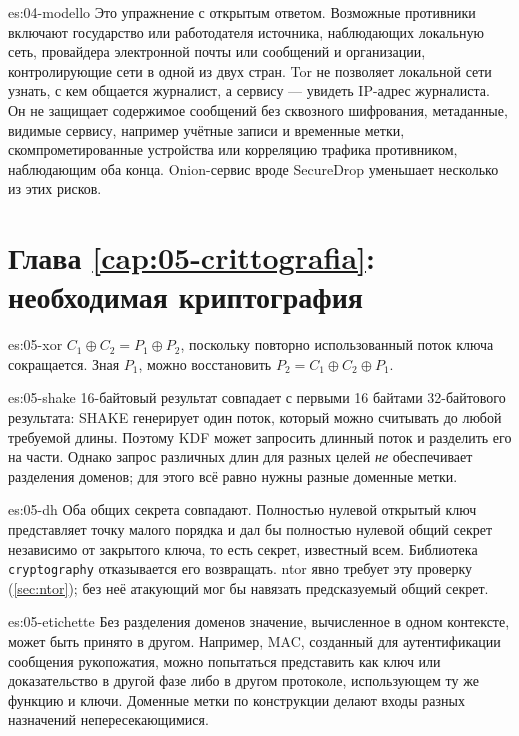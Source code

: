 \begin{soluzione}{es:04-modello}
Это упражнение с открытым ответом. Возможные противники включают государство или работодателя источника, наблюдающих локальную сеть, провайдера электронной почты или сообщений и организации, контролирующие сети в одной из двух стран. Tor не позволяет локальной сети узнать, с кем общается журналист, а сервису — увидеть IP-адрес журналиста. Он не защищает содержимое сообщений без сквозного шифрования, метаданные, видимые сервису, например учётные записи и временные метки, скомпрометированные устройства или корреляцию трафика противником, наблюдающим оба конца. Onion-сервис вроде SecureDrop уменьшает несколько из этих рисков.
\end{soluzione}

\section*{Глава \ref{cap:05-crittografia}: необходимая криптография}

\begin{soluzione}{es:05-xor}
$C_1 \oplus C_2 = P_1 \oplus P_2$, поскольку повторно использованный поток ключа сокращается. Зная $P_1$, можно восстановить $P_2 = C_1 \oplus C_2 \oplus P_1$.
\end{soluzione}

\begin{soluzione}{es:05-shake}
16-байтовый результат совпадает с первыми 16 байтами 32-байтового результата: SHAKE генерирует один поток, который можно считывать до любой требуемой длины. Поэтому KDF может запросить длинный поток и разделить его на части. Однако запрос различных длин для разных целей \emph{не} обеспечивает разделения доменов; для этого всё равно нужны разные доменные метки.
\end{soluzione}

\begin{soluzione}{es:05-dh}
Оба общих секрета совпадают. Полностью нулевой открытый ключ представляет точку малого порядка и дал бы полностью нулевой общий секрет независимо от закрытого ключа, то есть секрет, известный всем. Библиотека \texttt{cryptography} отказывается его возвращать. ntor явно требует эту проверку (\cref{sec:ntor}); без неё атакующий мог бы навязать предсказуемый общий секрет.
\end{soluzione}

\begin{soluzione}{es:05-etichette}
Без разделения доменов значение, вычисленное в одном контексте, может быть принято в другом. Например, MAC, созданный для аутентификации сообщения рукопожатия, можно попытаться представить как ключ или доказательство в другой фазе либо в другом протоколе, использующем ту же функцию и ключи. Доменные метки по конструкции делают входы разных назначений непересекающимися.
\end{soluzione}

